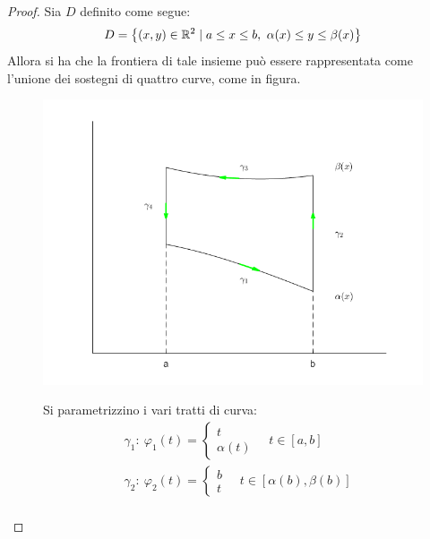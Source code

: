  \begin{proof}
 Sia $D$ definito come segue:
        \begin{equation}
          D=  \left\{ (x,y) \in \mathbb{R}^2 \mid a \leq x \leq b,\ \alpha(x) \leq y \leq \beta(x)\right\}
        \end{equation}
Allora si ha che la frontiera di tale insieme può essere rappresentata come l'unione dei sostegni di quattro curve, come in figura.
 \begin{figure}[H]
     \centering
     \begin{minipage}{0.3\textwidth}
     \includegraphics[width=\textwidth]{Capitoli/Capitolo5/Curve per GG.png}
     \end{minipage}
     \begin{minipage}{0.63\textwidth}
        Si parametrizzino i vari tratti di curva: 
        \begin{equation}
            \begin{aligned}
                &\gamma_1:\ \varphi_1(t)= \begin{cases}
                    t\\
                    \alpha(t)
                \end{cases}
                \quad t \in [a,b]\\
                &\gamma_2:\ \varphi_2(t)= \begin{cases}
                    b\\
                    t
                \end{cases}
                \quad t \in [\alpha(b), \beta(b)]\\

\end{aligned}
\end{equation}
\end{minipage}
\end{figure}
\end{proof}
